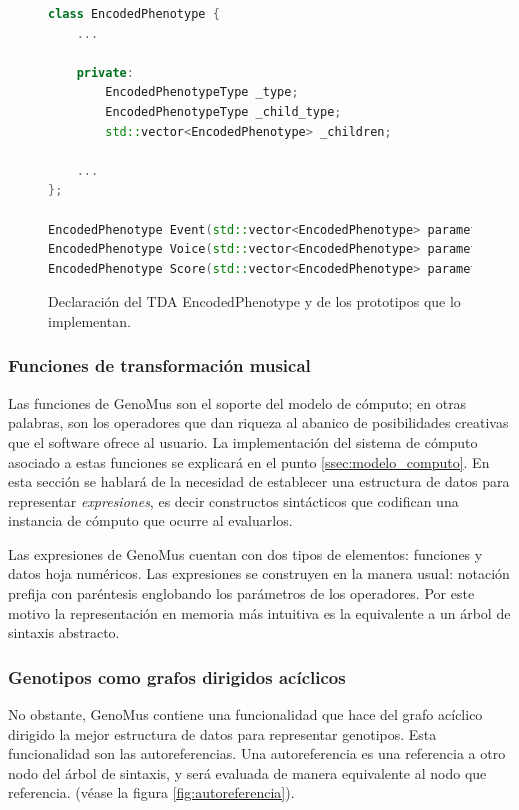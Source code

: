 \begin{figure}
    \centering
    \begin{lstlisting}[language=cpp]
class EncodedPhenotype {
    ...
    
    private:
        EncodedPhenotypeType _type;
        EncodedPhenotypeType _child_type;
        std::vector<EncodedPhenotype> _children;
        
    ...
};

EncodedPhenotype Event(std::vector<EncodedPhenotype> parameters);
EncodedPhenotype Voice(std::vector<EncodedPhenotype> parameters);
EncodedPhenotype Score(std::vector<EncodedPhenotype> parameters);
    \end{lstlisting}
    \caption{Declaración del TDA EncodedPhenotype y de los prototipos que lo implementan.}
    \label{fig:decoded_phenotype_hpp}
\end{figure}


\subsubsection{Funciones de transformación musical}

Las funciones de GenoMus son el soporte del modelo de cómputo; en otras palabras, son los operadores que dan riqueza al abanico de posibilidades creativas que el software ofrece al usuario. La implementación del sistema de cómputo asociado a estas funciones se explicará en el punto \ref{ssec:modelo_computo}. En esta sección se hablará de la necesidad de establecer una estructura de datos para representar \textit{expresiones}, es decir constructos sintácticos que codifican una instancia de cómputo que ocurre al evaluarlos. 

Las expresiones de GenoMus cuentan con dos tipos de elementos: funciones y datos hoja numéricos. Las expresiones se construyen en la manera usual: notación prefija con paréntesis englobando los parámetros de los operadores. Por este motivo la representación en memoria más intuitiva es la equivalente a un árbol de sintaxis abstracto\cite{dragon-book-ast}.

\subsubsection{Genotipos como grafos dirigidos acíclicos}

No obstante, GenoMus contiene una funcionalidad que hace del grafo acíclico dirigido la mejor estructura de datos para representar genotipos. Esta funcionalidad son las autoreferencias. Una autoreferencia es una referencia a otro nodo del árbol de sintaxis, y será evaluada de manera equivalente al nodo que referencia. (véase la figura \ref{fig:autoreferencia}).

